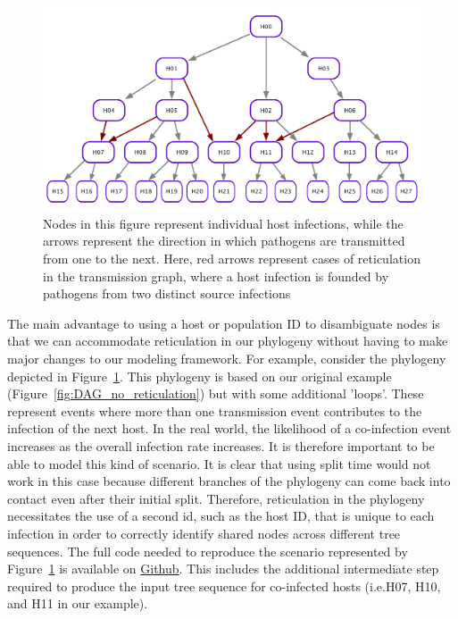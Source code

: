 \documentclass[12pt]{article}
\newcommand*{\ie}{i.e.\xcomma}
\begin{document}
\begin{figure}[h!]
    \centering
     \includegraphics[width=\textwidth]{figures/DAG_w_reticulation.pdf}
     \caption{
        Nodes in this figure represent individual host infections, while the arrows represent the direction in which pathogens are transmitted from one to the next. Here, red arrows represent cases of reticulation in the transmission graph, where a host infection is founded by pathogens from two distinct source infections
     \label{fig:DAG_w_reticulation}
     }
    \end{figure}

The main advantage to using a host or population ID to disambiguate nodes is that we can accommodate reticulation in our phylogeny without having to make major
changes to our modeling framework. For example, consider the phylogeny depicted in Figure~\ref{fig:DAG_w_reticulation}. This phylogeny is based on our original example (Figure~\ref{fig:DAG_no_reticulation}) but with some
additional 'loops'. These represent events where more than one transmission event contributes to the infection of the next host. In the real world, the likelihood of a co-infection event
increases as the overall infection rate increases. It is therefore important to be able to model this kind of scenario. It is clear that using split time would not work in this case because
different branches of the phylogeny can come back into contact even after their initial split. Therefore, reticulation in the phylogeny necessitates the use of a second id, such as the host ID, that is unique to each infection in order to correctly identify shared nodes across different tree sequences. The full code needed to reproduce the scenario represented by Figure~\ref{fig:DAG_w_reticulation} is available on \href{https://github.com/petrelharp/pyslim_paper/tree/main/code/virus_example_w_reticulation}{Github}. This includes the additional intermediate step required to produce the input tree sequence for co-infected hosts (\ie H07, H10, and H11 in our example). %
\end{document}
